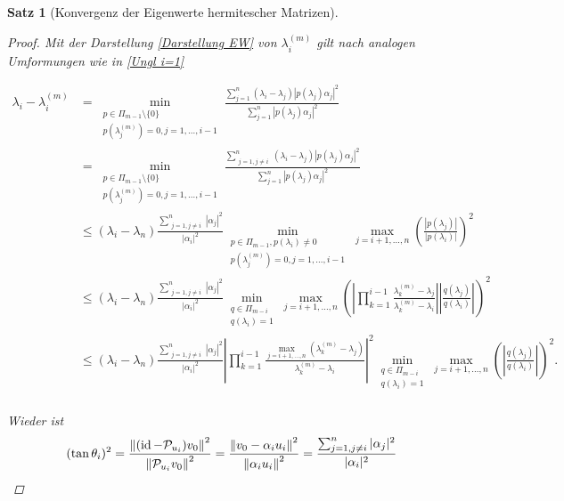 \documentclass{article}
\theoremstyle{plain}
\newtheorem{theorem}    {Satz}   [section]
\begin{document}
\begin{theorem}[Konvergenz der Eigenwerte hermitescher Matrizen]
\begin{proof}
	Mit der Darstellung \eqref{Darstellung EW} von $\lambda_i^{(m)}$ gilt nach analogen Umformungen wie in \eqref{Ungl i=1}

	\begin{equation*}
		\begin{aligned}
			\lambda_i - \lambda_i^{(m)} &= \min_{\substack{p\in \Pi_{m-1}\setminus \{0\} \\ p(\lambda_j^{(m)}) = 0, j = 1,\dots,i-1}} \frac{\sum_{j=1}^{n} (\lambda_i - \lambda_j)|p(\lambda_j)\alpha_j|^2}{\sum_{j=1}^{n} |p(\lambda_j)\alpha_j|^2} \\
			&= \min_{\substack{p\in \Pi_{m-1}\setminus \{0\} \\ p(\lambda_j^{(m)}) = 0, j = 1,\dots,i-1}} \frac{\sum_{\substack{j=1, j\neq i}}^{n} (\lambda_i - \lambda_j)|p(\lambda_j)\alpha_j|^2}{\sum_{j=1}^{n} |p(\lambda_j)\alpha_j|^2} \\
			& \le (\lambda_i - \lambda_n) \frac{\sum_{\substack{j=1, j\neq i}}^{n} |\alpha_j|^2}{|\alpha_i|^2} \min_{\substack{p\in \Pi_{m-1}, p(\lambda_i) \neq 0 \\ p(\lambda_j^{(m)}) = 0, j = 1,\dots,i-1}} \max_{j=i+1,\dots,n} \left(\frac{|p(\lambda_j)|}{|p(\lambda_i)|}\right)^2 \\
			&\le (\lambda_i - \lambda_n) \frac{\sum_{\substack{j=1, j\neq i}}^{n} |\alpha_j|^2}{|\alpha_i|^2} \min_{\substack{q\in \Pi_{m-i} \\ q(\lambda_i) = 1}} \max_{j=i+1,\dots,n} \left(\left|\prod_{k = 1}^{i-1} \frac{\lambda_k^{(m)} -\lambda_j}{\lambda_k^{(m)} - \lambda_i}\right| \left|\frac{q(\lambda_j)}{q(\lambda_i)}\right|\right)^2 \\
			&\le (\lambda_i - \lambda_n) \frac{\sum_{\substack{j=1, j\neq i}}^{n} |\alpha_j|^2}{|\alpha_i|^2} \left|\prod_{k = 1}^{i-1} \frac{\max_{j=i+1,\dots,n} (\lambda_k^{(m)} -\lambda_j)}{\lambda_k^{(m)} - \lambda_i}\right|^2 \min_{\substack{q\in \Pi_{m-i} \\ q(\lambda_i) = 1}} \max_{j=i+1,\dots,n} \left(\left|\frac{q(\lambda_j)}{q(\lambda_i)}\right|\right)^2. \\
		\end{aligned}
	\end{equation*}

	Wieder ist
	\begin{equation*}
		(\tan\theta_i)^2 = \frac{{\left \| (\operatorname{id} - \mathcal{P}_{u_i})v_0 \right \|}_{}^2}{{\left \|  \mathcal{P}_{u_i}v_0 \right \|}_{}^2} = \frac{{\left \| v_0 - \alpha_i u_i \right \|}_{}^2}{{\left \| \alpha_i u_i \right \|}_{}^2} = \frac{\sum_{\substack{j=1, j\neq i}}^{n} |\alpha_j|^2}{|\alpha_i|^2}
	\end{equation*}


\end{proof}
\end{theorem}
\end{document}
